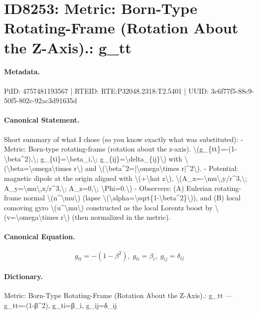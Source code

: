 \section*{ID8253: Metric: Born-Type Rotating-Frame (Rotation About the Z-Axis).: g\_tt}
\paragraph{Metadata.}
PiID: 4757481193567 | RTEID: RTE:P32048.2318:T2.5401 | UUID: 3c6f77f5-88c9-50f5-802c-92ac3d91635d

\paragraph{Canonical Statement.}
Short summary of what I chose (so you know exactly what was substituted): - Metric: Born-type rotating-frame (rotation about the z-axis). \textbackslash{}(g\_\{tt\}=-(1-\textbackslash{}beta\textasciicircum{}2),\textbackslash{}; g\_\{ti\}=\textbackslash{}beta\_i,\textbackslash{}; g\_\{ij\}=\textbackslash{}delta\_\{ij\}\textbackslash{}) with \textbackslash{}(\textbackslash{}beta=\textbackslash{}omega\textbackslash{}times r\textbackslash{}) and \textbackslash{}(\textbackslash{}beta\textasciicircum{}2=|\textbackslash{}omega\textbackslash{}times r|\textasciicircum{}2\textbackslash{}). - Potential: magnetic dipole at the origin aligned with \textbackslash{}(+\textbackslash{}hat z\textbackslash{}), \textbackslash{}(A\_x=-\textbackslash{}mu\textbackslash{},y/r\textasciicircum{}3,\textbackslash{}; A\_y=\textbackslash{}mu\textbackslash{},x/r\textasciicircum{}3,\textbackslash{}; A\_z=0,\textbackslash{}; \textbackslash{}Phi=0.\textbackslash{}) - Observers: (A) Eulerian rotating-frame normal \textbackslash{}(n\textasciicircum{}\textbackslash{}mu\textbackslash{}) (lapse \textbackslash{}(\textbackslash{}alpha=\textbackslash{}sqrt\{1-\textbackslash{}beta\textasciicircum{}2\}\textbackslash{})), and (B) local comoving gyro \textbackslash{}(u\textasciicircum{}\textbackslash{}mu\textbackslash{}) constructed as the local Lorentz boost by \textbackslash{}(v=\textbackslash{}omega\textbackslash{}times r\textbackslash{}) (then normalized in the metric).

\paragraph{Canonical Equation.}
\[
g_{tt}=-(1-\beta^2),\; g_{ti}=\beta_i,\; g_{ij}=\delta_{ij}
\]

\paragraph{Dictionary.}
Metric: Born-Type Rotating-Frame (Rotation About the Z-Axis).: g\_tt — g\_tt=-(1-β\textasciicircum{}2), g\_ti=β\_i, g\_ij=δ\_ij


